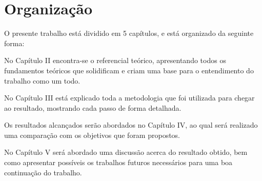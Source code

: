\section{Organização}
O presente trabalho está dividido em 5 capítulos, e está organizado da seguinte forma:

No Capítulo II encontra-se o referencial teórico, apresentando todos os fundamentos teóricos que solidificam e criam uma base para o entendimento do trabalho como um todo.

No Capítulo III está explicado toda a metodologia que foi utilizada para chegar ao resultado, mostrando cada passo de forma detalhada.

Os resultados alcançados serão abordados no Capítulo IV, ao qual será realizado uma comparação com os objetivos que foram propostos.

No Capítulo V será abordado uma discussão acerca do resultado obtido, bem como apresentar possíveis os trabalhos futuros necessários para uma boa continuação do trabalho.
    












